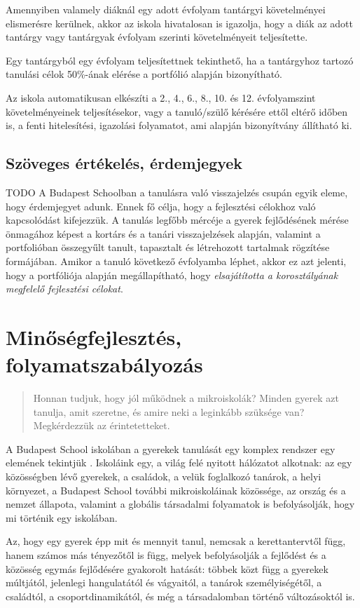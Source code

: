 Amennyiben valamely diáknál egy adott évfolyam tantárgyi követelményei elismerésre kerülnek, akkor az iskola hivatalosan is igazolja, hogy a diák az adott tantárgy vagy tantárgyak évfolyam szerinti követelményeit teljesítette.

Egy tantárgyból egy évfolyam teljesítettnek tekinthető, ha a tantárgyhoz tartozó tanulási célok 50\%-ának elérése a portfólió alapján bizonyítható.

Az iskola automatikusan elkészíti a 2., 4., 6., 8., 10. és 12. évfolyamszint követelményeinek teljesítésekor, vagy a tanuló/szülő kérésére ettől eltérő időben is, a fenti hitelesítési, igazolási folyamatot, ami alapján bizonyítvány állítható ki.

\subsection{Szöveges értékelés, érdemjegyek}
TODO
A Budapest Schoolban a tanulásra való visszajelzés csupán egyik eleme, hogy érdemjegyet adunk. Ennek fő célja, hogy a fejlesztési célokhoz való kapcsolódást kifejezzük. A tanulás legfőbb mércéje a gyerek fejlődésének mérése önmagához képest a kortárs és a tanári visszajelzések alapján, valamint a portfolióban összegyűlt tanult, tapasztalt és létrehozott tartalmak rögzítése formájában.  Amikor a tanuló következő évfolyamba léphet, akkor ez azt jelenti, hogy a portfóliója alapján megállapítható, hogy \emph{elsajátította a korosztályának megfelelő fejlesztési célokat}.


\section{Minőségfejlesztés, folyamatszabályozás}
\label{sec:minosegbiztositas}
\begin{quote}
Honnan tudjuk, hogy jól működnek a mikroiskolák? Minden gyerek azt tanulja, amit szeretne, és amire neki a leginkább szüksége van? Megkérdezzük az érintetetteket.
\end{quote}


A Budapest School iskolában a gyerekek tanulását egy komplex rendszer egy elemének tekintjük \citep{barabasi}. Iskoláink egy, a világ felé nyitott hálózatot alkotnak: az egy közösségben lévő gyerekek, a családok, a velük foglalkozó tanárok, a helyi környezet, a Budapest School további mikroiskoláinak közössége, az ország és a nemzet állapota, valamint a globális társadalmi folyamatok is befolyásolják, hogy mi történik egy iskolában.

Az, hogy egy gyerek épp mit és mennyit tanul, nemcsak a kerettantervtől függ, hanem számos más tényezőtől is függ, melyek befolyásolják a fejlődést és a közösség egymás fejlődésére gyakorolt hatását: többek közt függ a gyerekek múltjától, jelenlegi hangulatától és vágyaitól, a tanárok személyiségétől, a családtól, a csoportdinamikától, és még a társadalomban történő változásoktól is.

